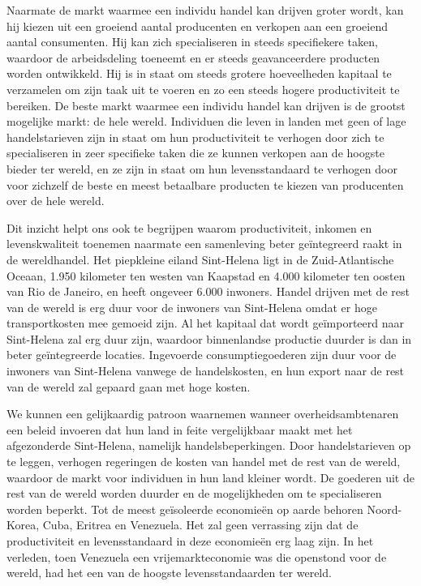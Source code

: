 \documentclass[
  a5paper,
  smalldemyvopaper,11pt,twoside,onecolumn,openright,extrafontsizes,
hidelinks]{memoir}
\begin{document}
Naarmate de markt waarmee een individu handel kan drijven groter wordt,
kan hij kiezen uit een groeiend aantal producenten en verkopen aan een
groeiend aantal consumenten. Hij kan zich specialiseren in steeds
specifiekere taken, waardoor de arbeidsdeling toeneemt en er steeds
geavanceerdere producten worden ontwikkeld. Hij is in staat om steeds
grotere hoeveelheden kapitaal te verzamelen om zijn taak uit te voeren
en zo een steeds hogere productiviteit te bereiken. De beste markt
waarmee een individu handel kan drijven is de grootst mogelijke markt:
de hele wereld. Individuen die leven in landen met geen of lage
handelstarieven zijn in staat om hun productiviteit te verhogen door
zich te specialiseren in zeer specifieke taken die ze kunnen verkopen
aan de hoogste bieder ter wereld, en ze zijn in staat om hun
levensstandaard te verhogen door voor zichzelf de beste en meest
betaalbare producten te kiezen van producenten over de hele wereld.

Dit inzicht helpt ons ook te begrijpen waarom productiviteit, inkomen en
levenskwaliteit toenemen naarmate een samenleving beter geïntegreerd
raakt in de wereldhandel. Het piepkleine eiland Sint-Helena ligt in de
Zuid-Atlantische Oceaan, 1.950 kilometer ten westen van Kaapstad en
4.000 kilometer ten oosten van Rio de Janeiro, en heeft ongeveer 6.000
inwoners. Handel drijven met de rest van de wereld is erg duur voor de
inwoners van Sint-Helena omdat er hoge transportkosten mee gemoeid zijn.
Al het kapitaal dat wordt geïmporteerd naar Sint-Helena zal erg duur
zijn, waardoor binnenlandse productie duurder is dan in beter
geïntegreerde locaties. Ingevoerde consumptiegoederen zijn duur voor de
inwoners van Sint-Helena vanwege de handelskosten, en hun export naar de
rest van de wereld zal gepaard gaan met hoge kosten.

We kunnen een gelijkaardig patroon waarnemen wanneer overheidsambtenaren
een beleid invoeren dat hun land in feite vergelijkbaar maakt met het
afgezonderde Sint-Helena, namelijk handelsbeperkingen. Door
handelstarieven op te leggen, verhogen regeringen de kosten van handel
met de rest van de wereld, waardoor de markt voor individuen in hun land
kleiner wordt. De goederen uit de rest van de wereld worden duurder en
de mogelijkheden om te specialiseren worden beperkt. Tot de meest
geïsoleerde economieën op aarde behoren Noord-Korea, Cuba, Eritrea en
Venezuela. Het zal geen verrassing zijn dat de productiviteit en
levensstandaard in deze economieën erg laag zijn. In het verleden, toen
Venezuela een vrijemarkteconomie was die openstond voor de wereld, had
het een van de hoogste levensstandaarden ter wereld.
\end{document}
